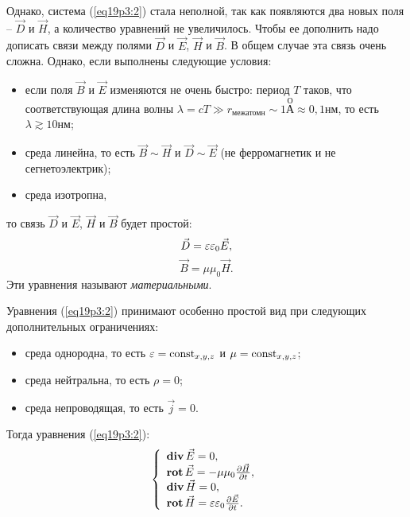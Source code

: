 	Однако, система (\ref{eq19p3:2}) стала неполной, так как появляются два
    новых поля -- \( \vec{D} \) и \( \vec{H} \), а количество уравнений не
    увеличилось. Чтобы ее дополнить надо дописать связи между полями
    \( \vec{D} \) и \( \vec{E} \), \( \vec{H} \) и \( \vec{B} \). В общем случае
    эта связь очень сложна. Однако, если выполнены следующие условия:
	\begin{itemize}
        \item если поля \( \vec{B} \) и \( \vec{E} \) изменяются не очень
            быстро: период \( T \) таков, что соответствующая длина волны
            \( \lambda = cT \gg r_\textit{межатомн} \sim 1
            \overset{\text{О}}{\text{А}} \approx 0,1\text{нм} \), то есть
            \( \lambda \gtrsim 10 \)нм;
            
        \item среда линейна, то есть \( \vec{B} \sim \vec{H} \) и
            \( \vec{D} \sim \vec{E} \) (не ферромагнетик и не сегнетоэлектрик);
            
        \item среда изотропна,
	\end{itemize}	
	то связь \( \vec{D} \) и \( \vec{E} \), \( \vec{H} \) и \( \vec{B} \) будет
    простой:
	\[
        \vec{D} = \varepsilon\varepsilon_0\vec{E},
    \]
	\[
        \vec{B} = \mu\mu_0\vec{H}.
    \]
	Эти уравнения называют \textit{материальными}.
	
    Уравнения (\ref{eq19p3:2}) принимают особенно простой вид при следующих
    дополнительных ограничениях:
	\begin{itemize}
	\item среда однородна, то есть \( \varepsilon = \mathrm{const}_{x, y, z} \) и
        \( \mu = \mathrm{const}_{x, y, z } \);
	\item среда нейтральна, то есть \( \rho = 0 \);
	\item среда непроводящая, то есть \( \vec{j} = 0 \).
	\end{itemize}
	Тогда уравнения (\ref{eq19p3:2}):
	\begin{equation}
        \left\{
        \begin{array}{l}
            \mathbf{div\,}\vec{E} = 0, \\
            \mathbf{rot\,}\vec{E} = -\mu\mu_0\frac{\partial \vec{H}}{\partial t}, \\
            \mathbf{div\,}\vec{H} = 0, \\
            \mathbf{rot\,}\vec{H} = \varepsilon\varepsilon_0\frac{\partial \vec{E}}{\partial t}.
        \end{array}
        \right.
        \label{eq19p3:3}
    \end{equation}
